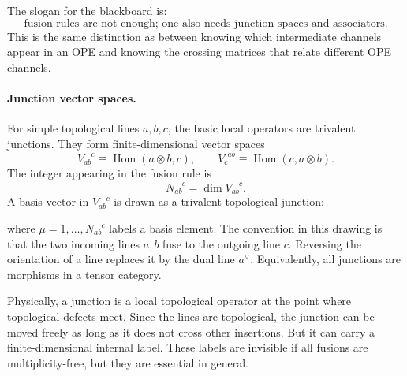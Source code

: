 \documentclass[11pt]{article}
\newcommand{\defeq}{\equiv}
\begin{document}
The slogan for the blackboard is:
\begin{equation}
  \text{fusion rules are not enough; one also needs junction spaces and associators.}
\end{equation}
This is the same distinction as between knowing which intermediate channels appear in an OPE and knowing the crossing matrices that relate different OPE channels.

\paragraph{Junction vector spaces.}
For simple topological lines $a,b,c$, the basic local operators are trivalent junctions.  They form finite-dimensional vector spaces
\begin{equation}
  V_{ab}^{\phantom{ab}c}\defeq \operatorname{Hom}(a\otimes b,c),
  \qquad
  V_{c}^{\phantom{c}ab}\defeq \operatorname{Hom}(c,a\otimes b) .
  \label{eq:junctionspaces}
\end{equation}
The integer appearing in the fusion rule is
\begin{equation}
  N_{ab}^{\phantom{ab}c}=\dim V_{ab}^{\phantom{ab}c} .
\end{equation}
A basis vector in $V_{ab}^{\phantom{ab}c}$ is drawn as a trivalent topological junction:
\begin{center}
\end{center}
where $\mu=1,\dots,N_{ab}^{\phantom{ab}c}$ labels a basis element.  The convention in this drawing is that the two incoming lines $a,b$ fuse to the outgoing line $c$.  Reversing the orientation of a line replaces it by the dual line $a^\vee$.  Equivalently, all junctions are morphisms in a tensor category.

Physically, a junction is a local topological operator at the point where topological defects meet.  Since the lines are topological, the junction can be moved freely as long as it does not cross other insertions.  But it can carry a finite-dimensional internal label.  These labels are invisible if all fusions are multiplicity-free, but they are essential in general.
\end{document}
